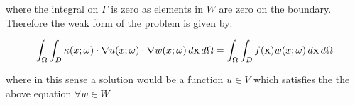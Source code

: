 where the integral on $\Gamma$ is zero as elements in $W$ are zero on the
boundary. Therefore the weak form of the problem is given by:

\begin{equation}\label{eq:wk-twod-stochastic}
    \int_{\Omega}\int_D\kappa(x;\omega)\cdot\nabla u(x;\omega)\cdot\nabla
    w(x;\omega)\, d\mathbf{x}\, d\Omega =
    \int_{\Omega}\int_D f(\mathbf{x})w(x;\omega)\, d\mathbf{x}\, d\Omega
\end{equation}

where in this sense a solution would be a function $u \in V$ which satisfies
the the above equation $\forall w \in W$
